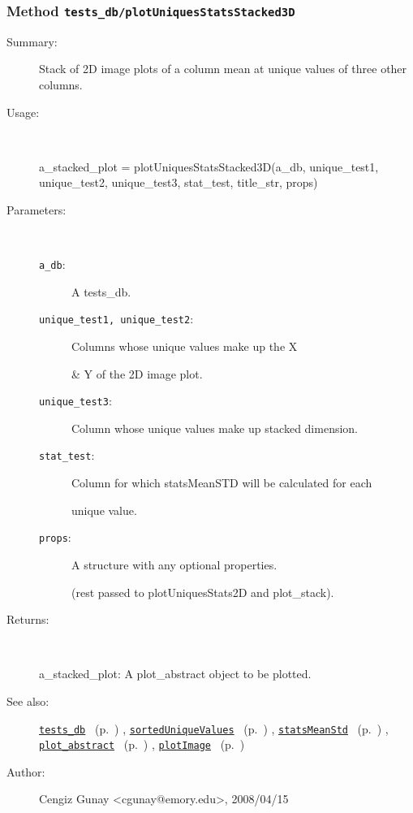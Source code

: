\subsubsection[Method \texttt{plotUniquesStatsStacked3D}]{Method \texttt{tests\_db/plotUniquesStatsStacked3D}}%
%
\label{ref_tests_db__plotUniquesStatsStacked3D}%
\hypertarget{ref_tests_db__plotUniquesStatsStacked3D}{}%
\begin{description}
\item[Summary:]Stack of 2D image plots of a column mean at unique values of three other columns.
%
\item[Usage:]~%
\begin{lyxcode}%
a\_stacked\_plot = plotUniquesStatsStacked3D(a\_db, unique\_test1, unique\_test2, 
 					unique\_test3, stat\_test, title\_str, props)
%
\end{lyxcode}%
%
%
\item[Parameters:]~
\begin{description}%
\item[\texttt{a\_db}:]
 A tests\_db.
\item[\texttt{unique\_test1, unique\_test2}:]
 Columns whose unique values make up the X

\& Y of the 2D image plot.
\item[\texttt{unique\_test3}:]
 Column whose unique values make up stacked dimension.
\item[\texttt{stat\_test}:]
 Column for which statsMeanSTD will be calculated for each

unique value.
\item[\texttt{props}:]
 A structure with any optional properties.

(rest passed to plotUniquesStats2D and plot\_stack).
\end{description}%
%
\item[Returns:
]~

	a\_stacked\_plot: A plot\_abstract object to be plotted.
%
%
\item[See also:]%
\hyperlink{ref_tests_db}{\texttt{tests\_db}}%
\ (p.~\pageref{ref_tests_db})%
%
, \hyperlink{ref_sortedUniqueValues}{\texttt{sortedUniqueValues}}%
\ (p.~\pageref{ref_sortedUniqueValues})%
%
, \hyperlink{ref_statsMeanStd}{\texttt{statsMeanStd}}%
\ (p.~\pageref{ref_statsMeanStd})%
%
, \hyperlink{ref_plot_abstract}{\texttt{plot\_abstract}}%
\ (p.~\pageref{ref_plot_abstract})%
%
, \hyperlink{ref_plotImage}{\texttt{plotImage}}%
\ (p.~\pageref{ref_plotImage})%
%
%
\item[Author:]%
Cengiz Gunay <cgunay@emory.edu>, 2008/04/15
%
\end{description}
\methodline%
